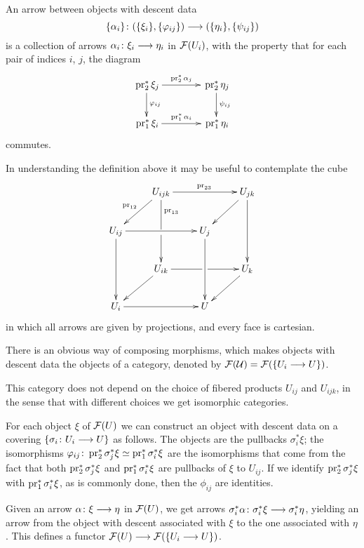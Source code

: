 \begin{4   STACKS}
\begin{4.1 Descent of objects of fibcats}
\begin{definition}
An arrow between objects with descent data
   \[
   \{\alpha_i\} \colon (\{\xi_i\}, \{\phi_{ij}\}) \arr
   (\{\eta_i\}, \{\psi_{ij}\})
   \]
is a collection of arrows $\alpha_i\colon \xi_i \arr \eta_i$ in $\mathcal{F}(U_i)$, with the property that for each pair of indices $i$, $j$, the diagram
   \[
   \xymatrix@C+15pt{
   {}\pr_2^* \xi_j \ar[r]^{\pr_2^* \alpha_j} \ar[d]^{\phi_{ij}}
   & {}\pr_2^* \eta_j\ar[d]^{\psi_{ij}}\\
   {}\pr_1^* \xi_i \ar[r]^{\pr_1^* \alpha_i}&
   {}\pr_1^* \eta_i
   }
   \]
commutes.

\end{definition}

In understanding the definition above it may be useful to contemplate the cube 
   \begin{equation}\label{eq:basic-cube}
   \xymatrix{
   &U_{ijk}\ar[rr]^{\pr_{23}}\ar'[d]^{\pr_{13}}[dd]
   \ar[ld]_{\pr_{12}}
   &&U_{jk}\ar[ld]\ar[dd]\\
   U_{ij}\ar[rr]\ar[dd]
   && U_j \ar[dd]\\
   &U_{ik} \ar[ld]\ar'[r][rr]
   &&U_k\ar[ld]\\
   U_i \ar[rr]&& U
   }
   \end{equation}
in which all arrows are given by projections, and every face is cartesian.

There is an obvious way of composing morphisms, which makes objects with descent data the objects of a category, denoted by $\mathcal{F}(\mathcal{U}) = \mathcal{F}(\{U_i \longrightarrow U\})$.

\begin{remark}
This category does not depend on the choice of fibered products $U_{ij}$ and $U_{ijk}$, in the sense that with different choices we get isomorphic categories.
\end{remark}

For each object $\xi$ of $\mathcal{F}(U)$ we can construct an object with descent data on a covering $\{\sigma_i \colon U_i \arr U\}$ as follows. The objects are the pullbacks $\sigma_i^* \xi$; the isomorphisms  $\varphi_{ij} \colon \operatorname{pr}_2^* \sigma_j^* \xi \simeq \operatorname{pr}_1^* \sigma_i^* \xi$ are the isomorphisms that come from the fact that both $\operatorname{pr}_2^* \sigma_j^* \xi$ and $\operatorname{pr}_1^* \sigma_i^* \xi$ are pullbacks of $\xi$ to $U_{ij}$. If we identify $\operatorname{pr}_2^* \sigma_j^* \xi$ with $\operatorname{pr}_1^* \sigma_i^* \xi$, as is commonly done, then the $\phi_{ij}$ are identities.

Given an arrow $\alpha \colon \xi \arr \eta$ in $\mathcal{F}(U)$, we get arrows $\sigma_i^*\alpha \colon \sigma_i^* \xi \arr \sigma_i^* \eta$, yielding an arrow from the object with descent associated with $\xi$ to the one associated with $\eta$. This defines a functor $\cF(U) \arr \cF(\{U_i \to U\})$.


\end{4.1 Descent of objects of fibcats}
\end{4   STACKS}
